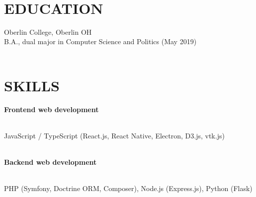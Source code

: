 \documentclass[margin]{res}
\newcommand{\Plus}{\raisebox{.4\height}{\scalebox{.6}{+}}}
\begin{document}
\begin{resume}


\vspace{-0.5em}\\
\section{EDUCATION} Oberlin College, Oberlin OH\\
B.A., dual major in Computer Science and Politics (May 2019)\\
\vspace{-2.5em}\\
\section{SKILLS}
\textbf{Frontend web development}\\
\vspace{-2.5em}\\
\begin{adjustwidth}{5mm}{}
JavaScript / TypeScript (React.js, React Native, Electron, D3.js, vtk.js)\\
\end{adjustwidth}
\vspace{-2em}\\

\textbf{Backend web development}\\
\vspace{-2.5em}\\
\begin{adjustwidth}{5mm}{}
PHP (Symfony, Doctrine ORM, Composer), Node.js (Express.js), Python (Flask)\\
\end{adjustwidth}
\vspace{-2em}\\


\end{resume}
\end{document}
